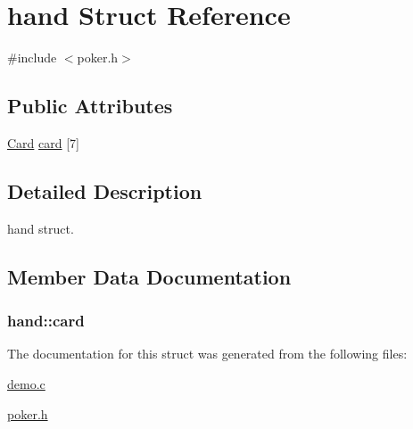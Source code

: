 \hypertarget{structhand}{\section{hand Struct Reference}
\label{structhand}
}


{\ttfamily \#include $<$poker.\+h$>$}

\subsection*{Public Attributes}
\begin{DoxyCompactItemize}
\item 
\hyperlink{demo_8c_aacb186b77382a02f7317dc38797f37c2}{Card} \hyperlink{structhand_adaa8b883710483668d5cfa84f83af2cc}{card} \mbox{[}7\mbox{]}
\end{DoxyCompactItemize}


\subsection{Detailed Description}
hand struct. 

\subsection{Member Data Documentation}
\hypertarget{structhand_adaa8b883710483668d5cfa84f83af2cc}{
\subsubsection[{card}]{ hand\+::card}}\label{structhand_adaa8b883710483668d5cfa84f83af2cc}


The documentation for this struct was generated from the following files\+:\begin{DoxyCompactItemize}
\item 
\hyperlink{demo_8c}{demo.\+c}\item 
\hyperlink{poker_8h}{poker.\+h}\end{DoxyCompactItemize}
